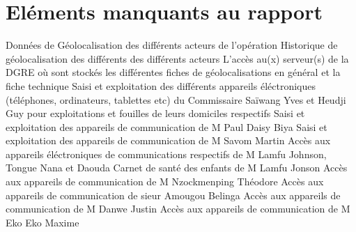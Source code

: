 \documentclass[french]{article}
\begin{document}
\section{Eléments manquants au rapport}
Données de Géolocalisation des différents acteurs de l'opération\newline
Historique de géolocalisation des différents des différents acteurs\newline
L'accès au(x) serveur(s) de la DGRE où sont stockés les différentes fiches de géolocalisations en général et la fiche technique\newline
Saisi et exploitation des différents appareils éléctroniques (téléphones, ordinateurs, tablettes etc) du Commissaire Saïwang Yves et Heudji Guy pour exploitations et fouilles de leurs domiciles respectifs\newline
Saisi et exploitation des appareils de communication de M Paul Daisy Biya\newline
Saisi et exploitation des appareils de communication de M Savom Martin\newline
Accès aux appareils éléctroniques de communications respectifs de M Lamfu Johnson, Tongue Nana et Daouda \newline 
Carnet de santé des enfants de M Lamfu Jonson\newline
Accès aux appareils de communication de M Nzockmenping Théodore\newline
Accès aux appareils de communication de sieur Amougou Belinga \newline
Accès aux appareils de communication de M Danwe Justin \newline
Accès aux appareils de communication de M Eko Eko Maxime\newline
\end{document}
